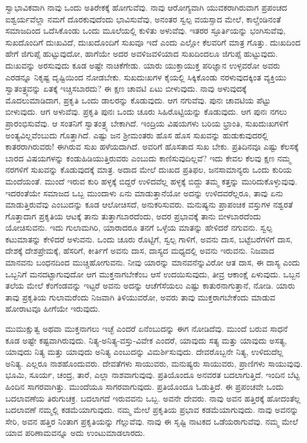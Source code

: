 ಸ್ವಾಭಾವಿಕವಾಗಿ ನಾವು ಒಂದು ಅತಿರೇಕಕ್ಕೆ ಹೋಗುವೆವು. ನಾವು ಆರೋಗ್ಯವಾಗಿ ಯುವಕರಾಗಿರುವಾಗ ಪ್ರಪಂಚದ ಐಶ್ವರ್ಯವೆಲ್ಲಾ ನಮಗೆ ದೊರಕುವುದೆಂದು ಭಾವಿಸುವೆವು, ಅನಂತರ ಸ್ವಲ್ಪ ವಯಸ್ಸಾದ ಮೇಲೆ, ಕಾಲ್ಚೆಂಡಿನಂತೆ ಸಮಾಜದಿಂದ ಒದೆಸಿಕೊಂಡು ಒಂದು ಮೂಲೆಯಲ್ಲಿ ಕುಳಿತು ಅಳುವೆವು. ಇತರರ ಸ್ಫೂರ್ತಿಯನ್ನು ಭಂಗಿಸುವೆವು, ಸುಖದೊಂದಿಗೆ ದುಃಖವಿದೆ, ದುಃಖದೊಂದಿಗೆ ಸುಖವೂ ಇದೆ ಎಂದು ಎಲ್ಲೋ ಕೆಲವರಿಗೆ ಮಾತ್ರ ಗೊತ್ತು. ದುಃಖದಿಂದ ಹೇಗೆ ಜಿಗುಪ್ಸೆ ಹುಟ್ಟುವುದೋ, ಹಾಗೆಯೇ ಅದರ ಅವಳಿಜವಳಿಯಾದ ಸುಖದಿಂದಲೂ ಜಿಗುಪ್ಸೆ ಹುಟ್ಟುವುದು. ದುಃಖವನ್ನು ಅರಸುವುದು ಕೂಡ ಅಷ್ಟೇ ನಾಚಿಕೆಗೇಡು. ಯಾರು ಯುಕ್ತಾಯುಕ್ತ ಪರಿಜ್ಞಾನ ಉಳ್ಳವರೋ ಅವರು ಎರಡನ್ನೂ ನಿಕೃಷ್ಟ ದೃಷ್ಟಿಯಿಂದ ನೋಡಬೇಕು. ಸುಖದುಃಖಗಳ ಕೈಯಲ್ಲಿ ಸಿಕ್ಕಿಕೊಂಡು ನರಳುವುದಕ್ಕಿಂತ ವ್ಯಕ್ತಿಯು ಸ್ವಾತಂತ್ರ್ಯವನ್ನು ಏತಕ್ಕೆ ಇಚ್ಚಿಸಬಾರದು? ಈ ಕ್ಷಣ ಚಾವಟಿ ಏಟು ಬೀಳುವುದು. ನಾವು ಅಳುವುದಕ್ಕೆ ಮೊದಲುಮಾಡಿದಾಗ, ಪ್ರಕೃತಿ ಒಂದು ಡಾಲರನ್ನು ಕೊಡುವುದು. ಆಗ ನಗುವೆವು. ಪುನಃ ಚಾವಟಿಯ ಪೆಟ್ಟು ಬೀಳುವುದು. ಆಗ ಅಳುವೆವು. ಪ್ರಕೃತಿ ಪುನಃ ಒಂದು ಚೂರು ಸಿಹಿರೊಟ್ಟಿಯನ್ನು ಕೊಡುವುದು. ಆಗ ಪುನಃ ನಗಲು ಪ್ರಾರಂಭಿಸುವೆವು. ಆ ಸಂತನಿಗೆ ಸ್ವಾತಂತ್ರ್ಯ ಬೇಕಾಗಿದೆ. ಇಂದ್ರಿಯ ವಿಷಯಗಳು ಬರಿಯ ಭ್ರಾಂತಿ, ಸುಖದುಃಖಗಳಿಗೆ ಅಂತ್ಯವಿಲ್ಲವೆಂಬುದು ಗೊತ್ತಾಗಿದೆ. ಎಷ್ಟು ಜನ ಶ‍್ರೀಮಂತರು ಹೊಸ ಹೊಸ ಸುಖವನ್ನು ಹುಡುಕುವುದರಲ್ಲಿ ಕಾತರರಾಗಿರುವರು! ಈಗಿರುವ ಸುಖ ಹಳೆಯದಾಗಿದೆ. ಅವರಿಗೆ ಹೊಸತಾದ ಸುಖ ಬೇಕು. ಪ್ರತಿದಿನವೂ ಎಷ್ಟು ಕೆಲಸಕ್ಕೆ ಬಾರದ ವಿಷಯಗಳನ್ನು ಕಂಡುಹಿಡಿಯುತ್ತಿರುವರು ಎಂಬುದು ಕಾಣಿಸುವುದಿಲ್ಲವೆ? ಇದು ಕೇವಲ ಕೆಲವು ಕ್ಷಣ ನಮ್ಮ ನರಗಳಿಗೆ ಸುಖವನ್ನು ಕೊಡುವುದಕ್ಕೆ ಮಾತ್ರ. ಅದಾದ ಮೇಲೆ ದುಃಖದ ಪ್ರತಿಫಲ, ಜನಸಾಮಾನ್ಯರು ಒಂದು ಕುರಿಯ ಮಂದೆಯಂತೆ. ಮುಂದೆ ಇರುವ ಕುರಿ ಹಳ್ಳಕ್ಕೆ ಬಿದ್ದರೆ ಉಳಿದವೆಲ್ಲ ಹಳ್ಳಕ್ಕೆ ಬಿದ್ದು ತಮ್ಮ ಕತ್ತನ್ನು ಮುರಿದುಕೊಳ್ಳುವುವು. ಇದರಂತೆಯೇ ಸಮಾಜದ ಒಬ್ಬ ಮುಂದಾಳು ಏನು ಮಾಡುತ್ತಾನೆಯೋ ಅದನ್ನು ಉಳಿದವರೆಲ್ಲರೂ, ತಾವು ಏನು ಮಾಡುತ್ತಿರುವೆವು ಎಂಬುದನ್ನು ಕೂಡ ಆಲೋಚಿಸದೆ, ಅನುಕರಿಸುವರು. ಮನುಷ್ಯನು ಪ್ರಾಪಂಚಿಕ ವಸ್ತುಗಳ ನಶ್ವರತೆ ಗೊತ್ತಾದಾಗ ಪ್ರಕೃತಿಯ ಆಟಕ್ಕೆ ತಾನು ತುತ್ತಾಗಬಾರದೆಂದು, ಅದರ ಪ್ರಭಾವಕ್ಕೆ ತಾನು ಬೀಳಬಾರದೆಂದು ಯೋಚಿಸುವನು. ಇದು ಗುಲಾಮಗಿರಿ, ಯಾರಾದರೂ ತನಗೆ ಒಳ್ಳೆಯ ಮಾತನ್ನು ಹೇಳಿದರೆ ನಗುವನು. ಸ್ವಲ್ಪ ಕಟುಮಾತನ್ನು ಕೇಳಿದರೆ ಅಳುವನು. ಒಂದು ಚೂರು ರೊಟ್ಟಿಗೆ, ಸ್ವಲ್ಪ ಗಾಳಿಗೆ, ಅವನು ದಾಸ, ಬಟ್ಟೆಬರೆಗಳಿಗೆ ದಾಸ, ದೇಶಕ್ಕೆ ದೇಶಪ್ರೇಮಕ್ಕೆ, ಹೆಸರಿಗೆ, ಕೀರ್ತಿಗೆ ಅವನು ದಾಸ, ದಾಸ್ಯದ ಮಧ್ಯದಲ್ಲಿ ಅವನು ಇರುವನು. ನಿಜವಾದ ಮಾನವನು ಬಂಧನದಿಂದ ಮುಚ್ಚಿಹೋಗುವನು. ನೀವು ಯಾರನ್ನು ಮಾನವನೆನ್ನುವಿರೋ ಆತ ದಾಸ, ಈ ದಾಸ್ಯ ಎಂದು ಒಬ್ಬನಿಗೆ ಮನದಟ್ಟಾಗುವುದೋ ಆಗ ಮುಕ್ತನಾಗಬೇಕೆಂಬ ಆಸೆ ಉದಯಿಸುವುದು, ತೀವ್ರ ಆಕಾಂಕ್ಷೆ ಏಳುವುದು. ಒಬ್ಬನ ತಲೆಯ ಮೇಲೆ ಕೆಂಗೆಂಡವನ್ನು ಇಟ್ಟರೆ ಅವನು ಅದನ್ನು ಆಚೆಗೆಸೆಯಲು ಎಷ್ಟು ಕಾತುರನಾಗುತ್ತಾನೆ, ನೋಡಿ. ಯಾರು ತಾವು ಪ್ರಕೃತಿಯ ಗುಲಾಮರೆಂದು ನಿಜವಾಗಿ ತಿಳಿಯುವರೋ, ಅವರು ತಾವು ಮುಕ್ತರಾಗಬೇಕೆಂದು ಮಾಡುವ ಹೋರಾಟವೂ ಹೀಗೆಯೇ ಇರುವುದು.

ಮುಮುಕ್ಷುತ್ವ ಅಥವಾ ಮುಕ್ತನಾಗಲು ಇಚ್ಛೆ ಎಂದರೆ ಏನೆಂಬುದನ್ನು ಈಗ ನೋಡಿದೆವು. ಮುಂದೆ ಬರುವ ಸಾಧನೆ ಕೂಡ ಅಷ್ಟೇ ಕಷ್ಟವಾಗಿರುವುದು. ನಿತ್ಯ-ಅನಿತ್ಯ-ವಸ್ತು-ವಿವೇಕ ಎಂದರೆ, ಯಾವುದು ಸತ್ಯ ಮತ್ತು ಯಾವುದು ಅಸತ್ಯ, ಯಾವುದು ನಿತ್ಯ ಮತ್ತು ಯಾವುದು ಅನಿತ್ಯ ಎಂಬುದನ್ನು ವಿಮರ್ಶಿಸುವುದು. ದೇವರೊಬ್ಬನೇ ನಿತ್ಯ, ಉಳಿದುದೆಲ್ಲ ಅನಿತ್ಯ. ಎಲ್ಲರೂ ನಾಶಹೊಂದುವರು. ದೇವತೆಗಳು ಸಾಯುವರು, ಮನುಷ್ಯರು ಸಾಯುವರು, ಪ್ರಾಣಿಗಳು ಸಾಯುವುವು. ಭೂಮಿ, ಸೂರ್ಯ, ಚಂದ್ರ, ತಾರೆ, ಎಲ್ಲಾ ನಾಶವಾಗುವುವು. ಪ್ರತಿಯೊಂದೂ ಅನವರತ ಬದಲಾಗುತ್ತಿದೆ. ಇಂದಿನ ಬೆಟ್ಟ ಹಿಂದಿನ ಸಾಗರವಾಗಿತ್ತು. ಮುಂದೆಯೂ ಸಾಗರವಾಗುವುದು. ಪ್ರತಿಯೊಂದೂ ಓಡುತ್ತಿದೆ. ಈ ಪ್ರಪಂಚವೇ ಒಂದು ಬದಲಾವಣೆಯ ತಿರುಗುಚಕ್ರ. ಬದಲಾಗದೆ ಇರುವವನು ಒಬ್ಬ. ಅವನೇ ದೇವರು. ನಾವು ಅವನ ಹತ್ತಿರಕ್ಕೆ ಹೋದಂತೆಲ್ಲ ಬದಲಾವಣೆ ನಮ್ಮಲ್ಲಿ ಕಡಮೆಯಾಗುವುದು. ನಮ್ಮ ಮೇಲೆ ಪ್ರಕೃತಿಯ ಪ್ರಭಾವ ಕಡಮೆಯಾಗುವುದು. ನಾವು ಅವನನ್ನು ಸೇರಿ, ಅವನ ಹತ್ತಿರ ನಿಂತಾಗ ಪ್ರಕೃತಿಯನ್ನು ಗೆಲ್ಲುವೆವು. ನಾವು ಈ ಸೃಷ್ಟಿ ನಾಟಕದ ಒಡೆಯರಾಗುವೆವು. ನಮ್ಮ ಮೇಲೆ ಯಾವ ಪರಿಣಾಮವನ್ನೂ ಅದು ಉಂಟುಮಾಡಲಾರದು.

